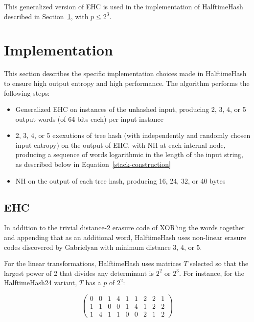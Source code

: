 \documentclass{llncs}
\begin{document}
This generalized version of EHC is used in the implementation of HalftimeHash described in Section~\ref{implementation}, with $p \le 2^3$.

\section{Implementation}
\label{implementation}

This section describes the specific implementation choices made in HalftimeHash to ensure high output entropy and high performance.
The algorithm performs the following steps:

\begin{itemize}
\item Generalized EHC on instances of the unhashed input, producing 2, 3, 4, or 5 output words (of 64 bits each) per input instance
\item 2, 3, 4, or 5 exexutions of tree hash (with independently and randomly chosen input entropy) on the output of EHC, with NH at each internal node, producing a sequence of words logarithmic in the length of the input string, as described below in Equation~\ref{stack-construction}
\item NH on the output of each tree hash, producing 16, 24, 32, or 40 bytes
\end{itemize}

\subsection{EHC}

In addition to the trivial distance-2 erasure code of XOR'ing the words together and appending that as an additional word, HalftimeHash uses non-linear erasure codes discovered by Gab\-ri\-el\-yan with minimum distance 3, 4, or 5. \cite{9-7-erasure-code,10-7-erasure-code,9-5-erasure-code}

For the linear transformations, HalftimeHash uses matrices $T$ selected so that the largest power of 2 that divides any determinant is $2^2$ or $2^3$.
For instance, for the HalftimeHash24 variant, $T$ has a $p$ of $2^2$:

\begin{displaymath}
  \left(
\begin{array}{rrrrrrrrr}
  0 & 0 & 1 & 4 & 1 & 1 & 2 & 2 & 1\\
  1 & 1 & 0 & 0 & 1 & 4 & 1 & 2 & 2\\
  1 & 4 & 1 & 1 & 0 & 0 & 2 & 1 & 2
\end{array}
\right)
\end{displaymath}
\end{document}
